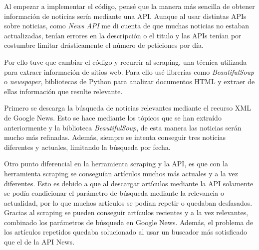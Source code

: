 Al empezar a implementar el código, pensé que la manera más sencilla de obtener información de noticias sería mediante una API. Aunque al usar distintas APIs sobre noticias, como \textit{News API} me di cuenta de que muchas noticias no estaban actualizadas, tenían errores en la descripción o el titulo y las APIs tenían por costumbre limitar drásticamente el número de peticiones por día.

\vspace{0.3cm}

Por ello tuve que cambiar el código y recurrir al scraping, una técnica utilizada para extraer información de sitios web. Para ello usé librerías como \textit{BeautifulSoup} o \textit{newspaper}, bibliotecas de Python para analizar documentos HTML y extraer de ellas información que resulte relevante.

\vspace{0.3cm}

Primero se descarga la búsqueda de noticias relevantes mediante el recurso XML de Google News. Esto se hace mediante los tópicos que se han extraído anteriormente y la biblioteca \textit{BeautifulSoup}, de esta manera las noticias serán mucho más refinadas. Además, siempre se intenta conseguir tres noticias diferentes y actuales, limitando la búsqueda por fecha.

\vspace{0.3cm}

Otro punto diferencial en la herramienta scraping y la API, es que con la herramienta scraping se conseguían artículos muchos más actuales y a la vez diferentes. Esto es debido a que al descargar artículos mediante la API solamente se podía condicionar el parámetro de búsqueda mediante la relevancia o actualidad, por lo que muchos artículos se podían repetir o quedaban desfasados. Gracias al scraping se pueden conseguir artículos recientes y a la vez relevantes, combinado los parámetros de búsqueda en Google News. Además, el problema de los artículos repetidos quedaba solucionado al usar un buscador más sotisficado que el de la API News.

\vspace{0.3cm}

